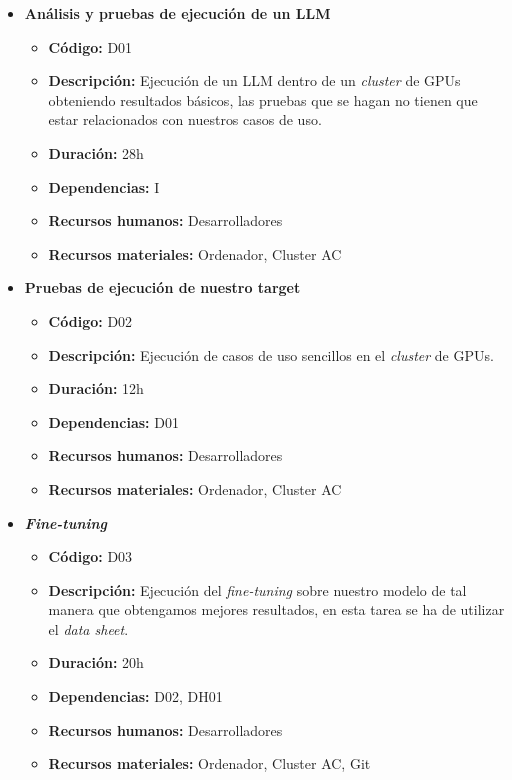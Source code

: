 \begin{itemize}
    \item \textbf{Análisis y pruebas de ejecución de un LLM}
        \begin{itemize}
            \item \textbf{Código:} D01
            \item \textbf{Descripción:} Ejecución de un LLM dentro de un \textit{cluster} de GPUs obteniendo resultados básicos, las pruebas que se hagan
                no tienen que estar relacionados con nuestros casos de uso.
            \item \textbf{Duración:} 28h
            \item \textbf{Dependencias:} I
            \item \textbf{Recursos humanos:} Desarrolladores
            \item \textbf{Recursos materiales:} Ordenador, Cluster AC
        \end{itemize}
    \item \textbf{Pruebas de ejecución de nuestro target}
        \begin{itemize}
            \item \textbf{Código:} D02
            \item \textbf{Descripción:} Ejecución de casos de uso sencillos en el \textit{cluster} de GPUs.
            \item \textbf{Duración:} 12h
            \item \textbf{Dependencias:} D01
            \item \textbf{Recursos humanos:} Desarrolladores
            \item \textbf{Recursos materiales:} Ordenador, Cluster AC
        \end{itemize}
    \item \textbf{\textit{Fine-tuning}}
        \begin{itemize}
            \item \textbf{Código:} D03
            \item \textbf{Descripción:} Ejecución del \textit{fine-tuning} sobre nuestro modelo de tal manera que obtengamos mejores resultados,
                en esta tarea se ha de utilizar el \textit{data sheet}.
            \item \textbf{Duración:} 20h
            \item \textbf{Dependencias:} D02, DH01
            \item \textbf{Recursos humanos:} Desarrolladores
            \item \textbf{Recursos materiales:} Ordenador, Cluster AC, Git

\end{itemize}
\end{itemize}
